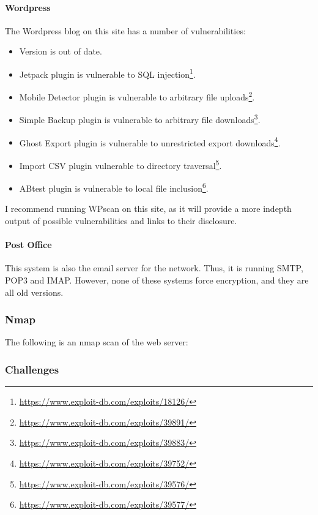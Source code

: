 				\paragraph{Wordpress}
					The Wordpress blog on this site has a number of vulnerabilities:
						\begin{itemize}
							\item Version is out of date.
							\item Jetpack plugin is vulnerable to SQL injection\footnote{\url{https://www.exploit-db.com/exploits/18126/}}.
							\item Mobile Detector plugin is vulnerable to arbitrary file uploads\footnote{\url{https://www.exploit-db.com/exploits/39891/}}.
							\item Simple Backup plugin is vulnerable to arbitrary file downloads\footnote{\url{https://www.exploit-db.com/exploits/39883/}}.
							\item Ghost Export plugin is vulnerable to unrestricted export downloads\footnote{\url{https://www.exploit-db.com/exploits/39752/}}.
							\item Import CSV plugin vulnerable to directory traversal\footnote{\url{https://www.exploit-db.com/exploits/39576/}}.
							\item ABtest plugin is vulnerable to local file inclusion\footnote{\url{https://www.exploit-db.com/exploits/39577/}}.
						\end{itemize}
					I recommend running WPscan on this site, as it will provide a more indepth output of possible vulnerabilities and links to their disclosure. 

				\paragraph{Post Office}
					This system is also the email server for the network. 
					Thus, it is running SMTP, POP3 and IMAP. 
					However, none of these systems force encryption, and they are all old versions. 

			\subsubsection{Nmap}
				The following is an nmap scan of the web server:
				


			\subsubsection{Challenges}
